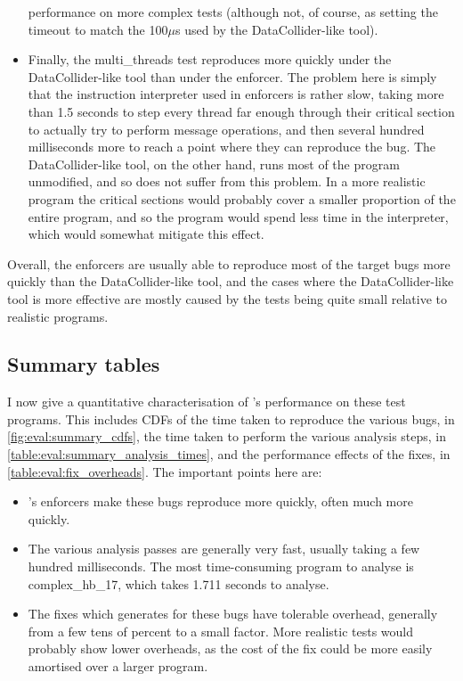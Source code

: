 \begin{itemize}
  performance on more complex tests (although not, of course, as
  setting the timeout to match the 100$\mu$s used by the
  DataCollider-like tool).
\item Finally, the multi\_threads test reproduces more quickly under
  the DataCollider-like tool than under the {\technique} enforcer.
  The problem here is simply that the instruction interpreter used in
  {\technique} enforcers is rather slow, taking more than 1.5 seconds
  to step every thread far enough through their critical section to
  actually try to perform message operations, and then several hundred
  milliseconds more to reach a point where they can reproduce the bug.
  The DataCollider-like tool, on the other hand, runs most of the
  program unmodified, and so does not suffer from this problem.  In a
  more realistic program the critical sections would probably cover a
  smaller proportion of the entire program, and so the program would
  spend less time in the interpreter, which would somewhat mitigate
  this effect.
\end{itemize}

Overall, the {\technique} enforcers are usually able to reproduce most
of the target bugs more quickly than the DataCollider-like tool, and
the cases where the DataCollider-like tool is more effective are
mostly caused by the tests being quite small relative to realistic
programs.

\subsection{Summary tables}

I now give a quantitative characterisation of {\technique}'s
performance on these test programs.  This includes CDFs of the time
taken to reproduce the various bugs, in
\autoref{fig:eval:summary_cdfs}, the time taken to perform the various
analysis steps, in \autoref{table:eval:summary_analysis_times}, and
the performance effects of the fixes, in
\autoref{table:eval:fix_overheads}.  The important points here are:

\begin{itemize}
\item {\Technique}'s enforcers make these bugs reproduce more quickly,
  often much more quickly.
\item The various analysis passes are generally very fast, usually
  taking a few hundred milliseconds.  The most time-consuming program
  to analyse is complex\_hb\_17, which takes 1.711 seconds to analyse.
\item The fixes which {\technique} generates for these bugs have
  tolerable overhead, generally from a few tens of percent to a small
  factor.  More realistic tests would probably show lower overheads,
  as the cost of the fix could be more easily amortised over a larger
  program.
\end{itemize}


